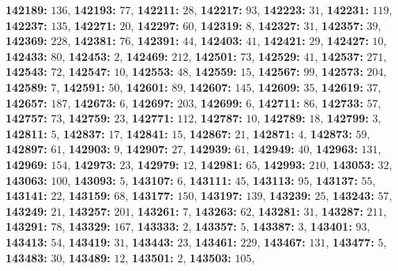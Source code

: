 \textsf{\bfseries 142189:} $136$, \textsf{\bfseries 142193:} $77$, \textsf{\bfseries 142211:} $28$, \textsf{\bfseries 142217:} $93$, \textsf{\bfseries 142223:} $31$, \textsf{\bfseries 142231:} $119$, \textsf{\bfseries 142237:} $135$, \textsf{\bfseries 142271:} $20$, \textsf{\bfseries 142297:} $60$, \textsf{\bfseries 142319:} $8$, \textsf{\bfseries 142327:} $31$, \textsf{\bfseries 142357:} $39$, \textsf{\bfseries 142369:} $228$, \textsf{\bfseries 142381:} $76$, \textsf{\bfseries 142391:} $44$, \textsf{\bfseries 142403:} $41$, \textsf{\bfseries 142421:} $29$, \textsf{\bfseries 142427:} $10$, \textsf{\bfseries 142433:} $80$, \textsf{\bfseries 142453:} $2$, \textsf{\bfseries 142469:} $212$, \textsf{\bfseries 142501:} $73$, \textsf{\bfseries 142529:} $41$, \textsf{\bfseries 142537:} $271$, \textsf{\bfseries 142543:} $72$, \textsf{\bfseries 142547:} $10$, \textsf{\bfseries 142553:} $48$, \textsf{\bfseries 142559:} $15$, \textsf{\bfseries 142567:} $99$, \textsf{\bfseries 142573:} $204$, \textsf{\bfseries 142589:} $7$, \textsf{\bfseries 142591:} $50$, \textsf{\bfseries 142601:} $89$, \textsf{\bfseries 142607:} $145$, \textsf{\bfseries 142609:} $35$, \textsf{\bfseries 142619:} $37$, \textsf{\bfseries 142657:} $187$, \textsf{\bfseries 142673:} $6$, \textsf{\bfseries 142697:} $203$, \textsf{\bfseries 142699:} $6$, \textsf{\bfseries 142711:} $86$, \textsf{\bfseries 142733:} $57$, \textsf{\bfseries 142757:} $73$, \textsf{\bfseries 142759:} $23$, \textsf{\bfseries 142771:} $112$, \textsf{\bfseries 142787:} $10$, \textsf{\bfseries 142789:} $18$, \textsf{\bfseries 142799:} $3$, \textsf{\bfseries 142811:} $5$, \textsf{\bfseries 142837:} $17$, \textsf{\bfseries 142841:} $15$, \textsf{\bfseries 142867:} $21$, \textsf{\bfseries 142871:} $4$, \textsf{\bfseries 142873:} $59$, \textsf{\bfseries 142897:} $61$, \textsf{\bfseries 142903:} $9$, \textsf{\bfseries 142907:} $27$, \textsf{\bfseries 142939:} $61$, \textsf{\bfseries 142949:} $40$, \textsf{\bfseries 142963:} $131$, \textsf{\bfseries 142969:} $154$, \textsf{\bfseries 142973:} $23$, \textsf{\bfseries 142979:} $12$, \textsf{\bfseries 142981:} $65$, \textsf{\bfseries 142993:} $210$, \textsf{\bfseries 143053:} $32$, \textsf{\bfseries 143063:} $100$, \textsf{\bfseries 143093:} $5$, \textsf{\bfseries 143107:} $6$, \textsf{\bfseries 143111:} $45$, \textsf{\bfseries 143113:} $95$, \textsf{\bfseries 143137:} $55$, \textsf{\bfseries 143141:} $22$, \textsf{\bfseries 143159:} $68$, \textsf{\bfseries 143177:} $150$, \textsf{\bfseries 143197:} $139$, \textsf{\bfseries 143239:} $25$, \textsf{\bfseries 143243:} $57$, \textsf{\bfseries 143249:} $21$, \textsf{\bfseries 143257:} $201$, \textsf{\bfseries 143261:} $7$, \textsf{\bfseries 143263:} $62$, \textsf{\bfseries 143281:} $31$, \textsf{\bfseries 143287:} $211$, \textsf{\bfseries 143291:} $78$, \textsf{\bfseries 143329:} $167$, \textsf{\bfseries 143333:} $2$, \textsf{\bfseries 143357:} $5$, \textsf{\bfseries 143387:} $3$, \textsf{\bfseries 143401:} $93$, \textsf{\bfseries 143413:} $54$, \textsf{\bfseries 143419:} $31$, \textsf{\bfseries 143443:} $23$, \textsf{\bfseries 143461:} $229$, \textsf{\bfseries 143467:} $131$, \textsf{\bfseries 143477:} $5$, \textsf{\bfseries 143483:} $30$, \textsf{\bfseries 143489:} $12$, \textsf{\bfseries 143501:} $2$, \textsf{\bfseries 143503:} $105$, 
